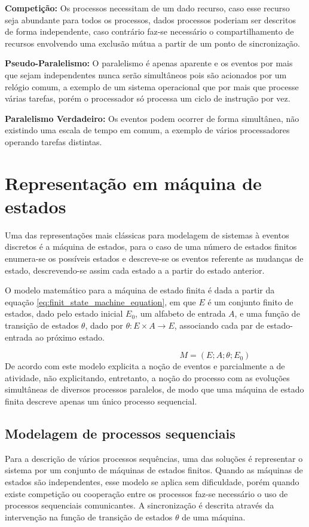 \textbf{Competição:} Os processos necessitam de um dado recurso, caso esse recurso seja abundante para todos os processos, dados processos poderiam ser descritos de forma independente, caso contrário faz-se necessário o compartilhamento de recursos envolvendo uma exclusão mútua a partir de um ponto de sincronização.

\textbf{Pseudo-Paralelismo:} O paralelismo é apenas aparente e os eventos por mais que sejam independentes nunca serão simultâneos pois são acionados por um relógio comum, a exemplo de um sistema operacional que por mais que processe várias tarefas, porém o processador só processa um ciclo de instrução por vez.

\textbf{Paralelismo Verdadeiro:} Os eventos podem ocorrer de forma simultânea, não existindo uma escala de tempo em comum, a exemplo de vários processadores operando tarefas distintas.

\section{Representação em máquina de estados}
Uma das representações mais clássicas para modelagem de sistemas à eventos discretos é a máquina de estados, para o caso de uma número de estados finitos enumera-se os possíveis estados e descreve-se os eventos referente as mudanças de estado, descrevendo-se assim cada estado a a partir do estado anterior.

O modelo matemático para a máquina de estado finita é dada a partir da equação \ref*{eq:finit_state_machine_equation}, em que $E$ é um conjunto finito de estados, dado pelo estado inicial $E_0$, um alfabeto de entrada $A$, e uma função de transição de estados $\theta$, dado por $\theta : E \times A \rightarrow E$, associando cada par de estado-entrada ao próximo estado.

\begin{equation}\label{eq:finit_state_machine_equation}
\hspace{6cm} %
    M = (E; A; \theta; E_0)
\end{equation}
De acordo com \cite{vallete} este modelo explicita a noção de eventos e parcialmente a de atividade, não explicitando, entretanto, a noção do processo com as evoluções simultâneas de diversos processos paralelos, de modo que uma máquina de estado finita descreve apenas um único processo sequencial.

\subsection{Modelagem de processos sequenciais}
Para a descrição de vários processos sequências, uma das soluções é representar o sistema por um conjunto de máquinas de estados finitos. Quando as máquinas de estados são independentes, esse modelo se aplica sem dificuldade, porém quando existe competição ou cooperação entre os processos faz-se necessário o uso de processos sequenciais comunicantes. A sincronização é descrita através da intervenção na função de transição de estados $\theta$ de uma máquina.

